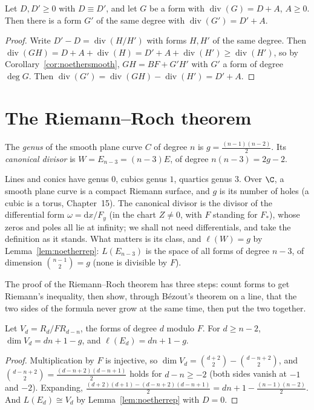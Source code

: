 \begin{theorem}\label{thm:residue}
Let $D,D'\ge0$ with $D\equiv D'$, and let $G$ be a form with $\operatorname{div}(G)=D+A$, $A\ge0$. Then there is a form $G'$ of the same degree with
$\operatorname{div}(G')=D'+A$.
\end{theorem}
\begin{proof}
Write $D'-D=\operatorname{div}(H/H')$ with forms $H,H'$ of the same degree. Then
$\operatorname{div}(GH)=D+A+\operatorname{div}(H)=D'+A+\operatorname{div}(H')\ge\operatorname{div}(H')$, so by Corollary~\ref{cor:noethersmooth},
$GH=BF+G'H'$ with $G'$ a form of degree $\deg G$. Then
$\operatorname{div}(G')=\operatorname{div}(GH)-\operatorname{div}(H')=D'+A$.
\end{proof}

\section{The Riemann--Roch theorem}

\begin{definition}
The \emph{genus} of the smooth plane curve $C$ of degree $n$ is $g=\frac{(n-1)(n-2)}2$. Its \emph{canonical divisor} is $W=E_{n-3}=(n-3)E$, of
degree $n(n-3)=2g-2$.
\end{definition}

Lines and conics have genus $0$, cubics genus $1$, quartics genus $3$. Over $\C$, a smooth plane curve is a compact Riemann surface, and $g$ is its
number of holes (a cubic is a torus, Chapter~15). The canonical divisor is the divisor of the differential form $\omega=\mathrm dx/F_y$ (in the
chart $Z\ne0$, with $F$ standing for $F_*$), whose zeros and poles all lie at infinity; we shall not need differentials, and take the definition as
it stands. What matters is its class, and $\ell(W)=g$ by Lemma~\ref{lem:noetherrep}: $L(E_{n-3})$ is the space of all forms of degree $n-3$, of
dimension $\binom{n-1}2=g$ (none is divisible by $F$).

The proof of the Riemann--Roch theorem has three steps: count forms to get Riemann's inequality, then show, through B\'ezout's theorem on a line, that the
two sides of the formula never grow at the same time, then put the two together.

\begin{proposition}\label{prop:countforms}
Let $V_d=R_d/FR_{d-n}$, the forms of degree $d$ modulo $F$. For $d\ge n-2$, $\dim V_d=dn+1-g$, and $\ell(E_d)=dn+1-g$.
\end{proposition}
\begin{proof}
Multiplication by $F$ is injective, so $\dim V_d=\binom{d+2}2-\binom{d-n+2}2$, and $\binom{d-n+2}2=\frac{(d-n+2)(d-n+1)}2$ holds for $d-n\ge-2$ (both sides vanish at $-1$ and $-2$).
Expanding, $\frac{(d+2)(d+1)-(d-n+2)(d-n+1)}2=dn+1-\frac{(n-1)(n-2)}2$. And $L(E_d)\cong V_d$ by Lemma~\ref{lem:noetherrep} with $D=0$.
\end{proof}

